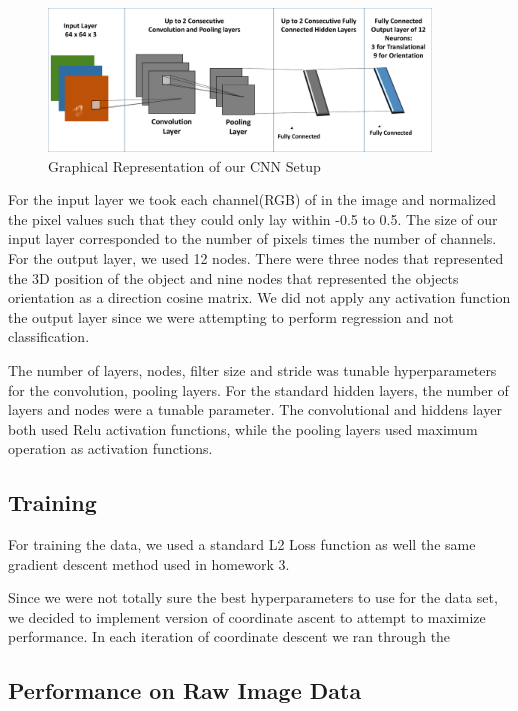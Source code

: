 \documentclass[journal]{IEEEtran}
\begin{document}
\begin{figure}
	\centering\hspace{-10 ex}
	\includegraphics[width=4in]{CNN_ARCH}
	\caption{Graphical Representation of our CNN Setup}
	\label{Fig:CNN_ARCH}
\end{figure}

For the input layer we took each channel(RGB) of in the image and normalized the pixel values such that they could only lay within -0.5 to 0.5. The size of our input layer corresponded to the number of pixels times the number of channels. For the output layer, we used 12 nodes. There were three nodes that represented the 3D position of the object and nine nodes that represented the objects orientation as a direction cosine matrix. We did not apply any activation function the output layer since we were attempting to perform regression and not classification. 

The number of layers, nodes, filter size and stride was tunable hyperparameters for the convolution, pooling layers. For the standard hidden layers, the number of layers and nodes were a tunable parameter. The convolutional and hiddens layer both used Relu activation functions, while the pooling layers used maximum operation as activation functions. 



\subsection{Training}
For training the data, we used a standard L2 Loss function as well the same gradient descent method used in homework 3. 

Since we were not totally sure the best hyperparameters to use for the data set, we decided to implement version of coordinate ascent to attempt to maximize performance. 
In each iteration of coordinate descent we ran through the 

\subsection{Performance on Raw Image Data}
\end{document}
